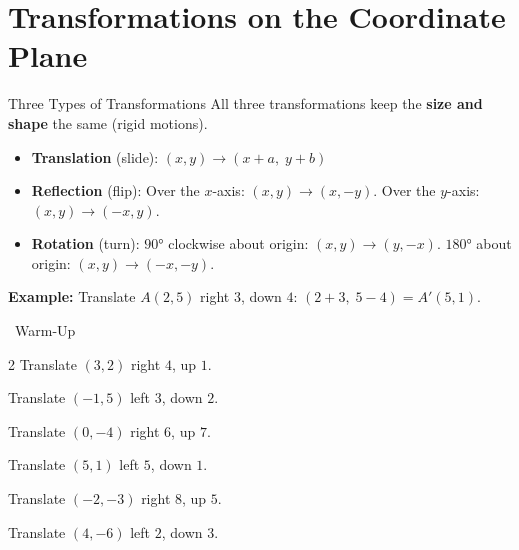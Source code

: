 \section{Transformations on the Coordinate Plane}

\begin{quickReview}{Three Types of Transformations}
All three transformations keep the \textbf{size and shape} the same (rigid motions).

\begin{itemize}[leftmargin=*]
    \item \textbf{Translation} (slide): $(x, y) \to (x + a,\; y + b)$
    \item \textbf{Reflection} (flip):
        Over the $x$-axis: $(x, y) \to (x, -y)$. \quad
        Over the $y$-axis: $(x, y) \to (-x, y)$.
    \item \textbf{Rotation} (turn):
        $90°$ clockwise about origin: $(x, y) \to (y, -x)$.
        $180°$ about origin: $(x, y) \to (-x, -y)$.
\end{itemize}

\medskip
\textbf{Example:} Translate $A(2, 5)$ right $3$, down $4$: $(2+3,\; 5-4) = A'(5, 1)$.
\end{quickReview}

\begin{practiceBox}[funGreen]{\faSun~Warm-Up}


\begin{multicols}{2}
\prob Translate $(3, 2)$ right $4$, up $1$. \answerBlank[2cm]

\prob Translate $(-1, 5)$ left $3$, down $2$. \answerBlank[2cm]

\prob Translate $(0, -4)$ right $6$, up $7$. \answerBlank[2cm]

\prob Translate $(5, 1)$ left $5$, down $1$. \answerBlank[2cm]

\prob Translate $(-2, -3)$ right $8$, up $5$. \answerBlank[2cm]

\prob Translate $(4, -6)$ left $2$, down $3$. \answerBlank[2cm]
\end{multicols}
\end{practiceBox}

